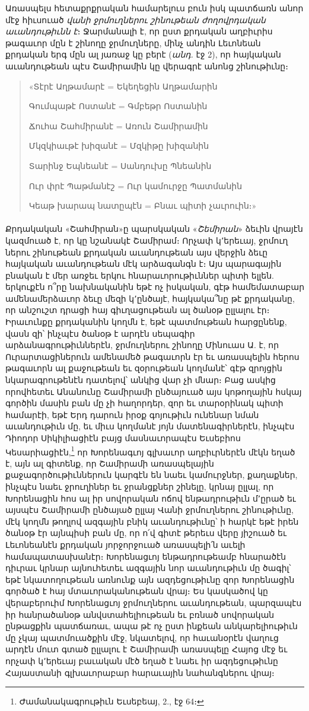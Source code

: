 \documentclass{article}
\begin{document}
{Առասպելս հետաքրքրական համարելուս բուն իսկ պատճառն անոր մէջ հիւսուած \emph{վանի ջրմուղներու շինութեան ժողովրդական աւանդութիւնն է}։ Ջարմանալի է, որ ըստ քրդական աղբիւրիս թագաւոր մըն է շինողը ջրմուղները, մինչ անդին Լեւոնեան քրդական երգ մըն ալ յառաջ կը բերէ (\emph{անդ.} էջ 2), որ հայկական աւանդութեան պէս Շամիրամին կը վերագրէ անոնց շինութիւնը։
\begin{quotation}
\arm
\small
«Տէրէ Աղթամարէ = Եկեղեցին Աղթամարին

Գումպաթէ Ոստանէ = Գմբեթր Ոստանին

Ճուհա Շահմիրանէ = Առուն Շամիրամին

Մկզկիաւթէ խիզանէ = Մզկիթը խիզանին

Տարինջ Եպնեանէ = Սանդուխը Պնեանին

Ուր փրէ Պաթմանէշ = Ուր կամուրջը Պատմանին

Կեաթ խարապ նատըպէն = Բնաւ պիտի չաւրուին։»
\end{quotation}
\paragraph{}
Քրդակական «Շահմիրան»ը պարսկական «\emph{Շեմիրան}» ձեւին վրայէն կազմուած է, որ կը նշանակէ Շամիրամ։ Որչափ կ՚երեւայ, ջրմուղ ներու շինութեան քրդական աւանդութեան այս վերջին ձեւը հայկական աւանդութեան մէկ արձագանգն է։ Այս պարագային բնական է մեր առջեւ երկու հնարաւորութիւններ պիտի ելլեն. երկուքէն ո՞րը նախնականին եթէ ոչ իսկական, գէթ համեմատաբար ամենամերձաւոր ձեւը մեզի կ՚ընծայէ, հայկակա՞նը թէ քրդականը, որ անշուշտ դրացի հայ գիւղացութեան ալ ծանօթ ըլլալու էր։ Իրաւունքը քրդականին կողմն է, եթէ պատմութեան հարցընենք, վասն զի՝ ինչպէս ծանօթ է արդէն սեպագիր արձանագրութիւններէն, ջրմուղներու շինողը Մինուաս Ա. է, որ Ուրարտացիներուն ամենամեծ թագաւորն էր եւ առասպելին հերոս թագաւորն ալ քաջութեան եւ զօրութեան կողմանէ՝ գէթ զրոյցին նկարագրութենէն դատելով՝ անկից վար չի մնար։ Բաց ասկից որովհետեւ Անանունը Շամիրամի ընծայուած այս կոթողային հսկայ գործին մասին բան մը չի հաղորդեր, զոր եւ տարօրինակ պիտի համարէի, եթէ Երդ դարուն իրօք գոյութիւն ունենար նման աւանդութիւն մը, եւ միւս կողմանէ յոյն մատենագիրներէն, ինչպէս Դիոդոր Սիկիլիացիէն բայց մասնաւորապէս Եւսեբիոս Կեսարիացիէն,\footnote{Ժամանակագրութիւն Եւսեբեայ, 2., էջ 64։} որ Խորենագւոյ գլխաւոր աղբիւրներէն մէկն եղած է, այն ալ գիտենք, որ Շամիրամի առասպելային քաջագործութիւններուն կարգէն են նաեւ կամուրջներ, քաղաքներ, ինչպէս նաեւ ջրուղիներ եւ ջրանցքներ շինելը, կրնայ ըլլալ, որ Խորենացին հոս ալ իր սովորական ոճով ենթադրութիւն մ՚ըրած եւ այսպէս Շամիրամի ընծայած ըլլայ Վանի ջրմուղներու շինութիւնը, մէկ կողմն թողլով ազգային բնիկ աւանդութիւնը՝ ի հարկէ եթէ իրեն ծանօթ էր այնպիսի բան մը, որ ո՛վ գիտէ թերեւս վերը յիշուած եւ Լեւոնեանէն քրդական յորջորջուած առասպելի՛ն աւելի համապատասխանէր։ Խորենացւոյ ենթադրութեամբ հնարածէն դիւրաւ կրնար այնուհետեւ ազգային նոր աւանդութիւն մը ծագիլ՝ եթէ նկատողութեան առնունք այն ազդեցութիւնը զոր Խորենացին գործած է հայ մտաւորականութեան վրայ։ Ես կասկածով կը վերաբերուիմ Խորենացւոյ ջրմուղներու աւանդութեան, պարզապէս իր հանրածանօթ անվստահելիութեան եւ բռնած սովորական ընթացքին պատճառաւ, ապա թէ ոչ ըստ ինքեան անկարելիութիւն մը չկայ պատմուածքին մէջ, նկատելով, որ հաւանօրէն վաղուց արդէն մուտ գտած ըլլալու է Շամիրամի առասպելը Հայոց մէջ եւ որչափ կ՚երեւայ բաւական մէծ եղած է նաեւ իր ազդեցութիւնը Հայաստանի գլխաւորաբար հարաւային նահանգներու վրայ։

}
\end{document}
